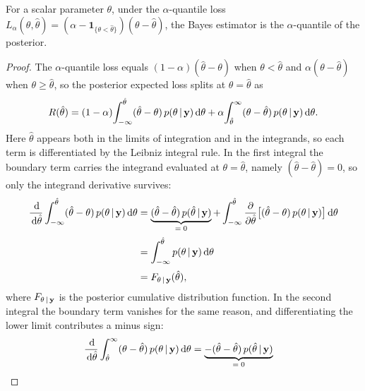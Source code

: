 \begin{proposition}
\label{prop:quantile}
For a scalar parameter $\theta$, under the $\alpha$-quantile loss
$L_\alpha(\theta, \hat{\theta}) = (\alpha -
\mathbf{1}_{\{\theta < \hat{\theta}\}})(\theta - \hat{\theta})$, the
Bayes estimator is the $\alpha$-quantile of the posterior.
\end{proposition}

\begin{proof}
The $\alpha$-quantile loss equals
$(1-\alpha)(\hat{\theta} - \theta)$ when $\theta < \hat{\theta}$ and
$\alpha(\theta - \hat{\theta})$ when $\theta \ge \hat{\theta}$, so the
posterior expected loss splits at $\theta = \hat{\theta}$ as
%
\begin{equation}
  R(\hat{\theta})
  = (1-\alpha)\!\int_{-\infty}^{\hat{\theta}}
    (\hat{\theta} - \theta)\,p(\theta \,|\, \mathbf{y}) \,\mathrm{d}\theta
  + \alpha\!\int_{\hat{\theta}}^{\infty}
    (\theta - \hat{\theta})\,p(\theta \,|\, \mathbf{y}) \,\mathrm{d}\theta.
\end{equation}
%
Here $\hat{\theta}$ appears both in the limits of integration and in
the integrands, so each term is differentiated by the Leibniz
integral rule. In the first integral the boundary term carries the
integrand evaluated at $\theta = \hat{\theta}$, namely
$(\hat{\theta} - \hat{\theta}) = 0$, so only the integrand derivative
survives:
%
\begin{align}
  \frac{\,\mathrm{d}}{\,\mathrm{d}\hat{\theta}}
  \int_{-\infty}^{\hat{\theta}}
  (\hat{\theta} - \theta)\,p(\theta \,|\, \mathbf{y}) \,\mathrm{d}\theta
  &= \underbrace{(\hat{\theta} - \hat{\theta})\,
     p(\hat{\theta} \,|\, \mathbf{y})}_{=\;0}
   + \int_{-\infty}^{\hat{\theta}}
     \frac{\partial}{\partial\hat{\theta}}
     \big[(\hat{\theta} - \theta)\,
     p(\theta \,|\, \mathbf{y})\big] \,\mathrm{d}\theta
   \notag\\[2pt]
  &= \int_{-\infty}^{\hat{\theta}}
     p(\theta \,|\, \mathbf{y}) \,\mathrm{d}\theta \\[2pt]
   &= F_{\theta \,|\, \mathbf{y}}(\hat{\theta}),
\end{align}
%
where $F_{\theta \,|\, \mathbf{y}}$ is the posterior cumulative
distribution function. 
In the second integral the boundary term vanishes for the same
reason, and differentiating the lower limit contributes a minus sign:
%
\begin{align}
  \frac{\dd}{\dd\hat{\theta}}
  \int_{\hat{\theta}}^{\infty}
  (\theta - \hat{\theta})\,p(\theta \given \mathbf{y}) \dd\theta
  &= \underbrace{-(\hat{\theta} - \hat{\theta})\,
     p(\hat{\theta} \given \mathbf{y})}_{=\;0}

\end{align}
\end{proof}
